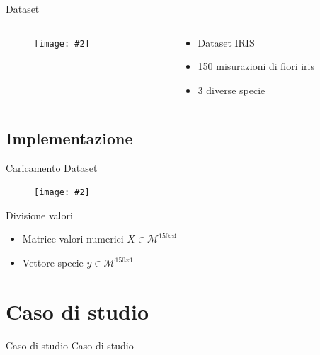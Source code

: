 \documentclass[xcolor={dvipsnames}]{beamer}%
\newcommand{\codice}[2]{}
\newcommand{\figcen}[2]{
	\begin{figure}
		\begin{center}
			\texttt{[image: \#2]}
		\end{center}
	\end{figure}
}
\begin{document}
	\begin{frame}{Dataset}
		\begin{columns}
			\begin{column}{.6\textwidth}
				\figcen{\columnwidth}{iris}
			\end{column}
			\begin{column}{.5\textwidth}
				\begin{itemize}
					\item Dataset IRIS
					\item 150 misurazioni di fiori iris 
					\item 3 diverse specie
				\end{itemize}
			\end{column}
		\end{columns}
	\end{frame}

	\subsection{Implementazione}
	
		\begin{frame}{Caricamento Dataset}
			\codice{16}{25}
			\figcen{.7\textwidth}{tab}
		\end{frame}
	
		\begin{frame}{Divisione valori}
			\begin{itemize}
				\item Matrice valori numerici $X \in \mathcal{M}^{150x4}$
				\item Vettore specie $y \in \mathcal{M}^{150x1}$
			\end{itemize}
			\codice{30}{32}
		\end{frame}

\section{Caso di studio}
	\begin{frame}{Caso di studio}
		Caso di studio
	\end{frame}
\end{document}
